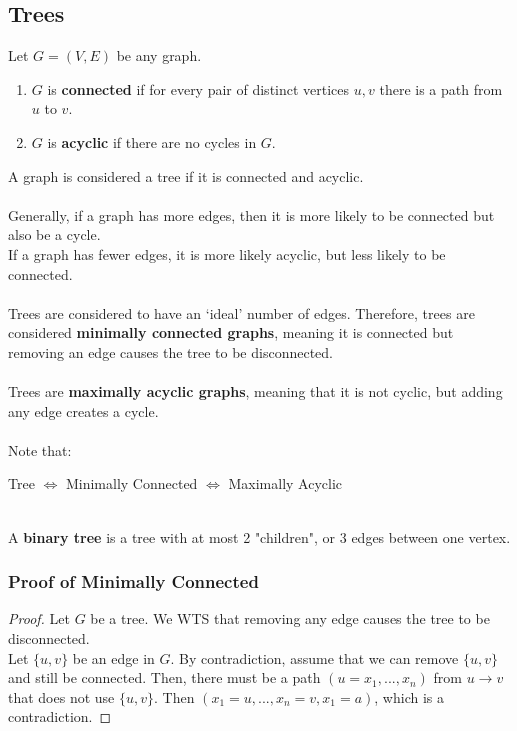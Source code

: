 \documentclass{article}
\begin{document}
\subsection{Trees}
Let $G = (V, E)$ be any graph.
\begin{enumerate}
    \item $G$ is \textbf{connected} if for every pair of distinct vertices $u, v$ there is a path from $u$ to $v$.
    \item $G$ is \textbf{acyclic} if there are no cycles in $G$.
\end{enumerate}
A graph is considered a tree if it is connected and acyclic.\\
\\
Generally, if a graph has more edges, then it is more likely to be connected but also be a cycle.\\
If a graph has fewer edges, it is more likely acyclic, but less likely to be connected.\\
\\
Trees are considered to have an `ideal' number of edges. Therefore, trees are considered \textbf{minimally connected graphs}, meaning it is connected but removing an edge causes the tree to be disconnected.\\
\\
Trees are \textbf{maximally acyclic graphs}, meaning that it is not cyclic, but adding any edge creates a cycle.\\
\\
Note that:
\begin{center}
    Tree $\iff$ Minimally Connected $\iff$ Maximally Acyclic
\end{center}
\\
A \textbf{binary tree} is a tree with at most 2 "children", or 3 edges between one vertex.
\subsubsection{Proof of Minimally Connected}
\begin{proof}
Let $G$ be a tree. We WTS that removing any edge causes the tree to be disconnected.\\
Let $\{u, v\}$ be an edge in $G$. By contradiction, assume that we can remove $\{u, v\}$ and still be connected. Then, there must be a path $(u = x_1, ..., x_n)$ from $u \to v$ that does not use $\{u, v\}$. Then $(x_1 = u, ..., x_n = v, x_1 = a)$, which is a contradiction.
\end{proof}
\end{document}
